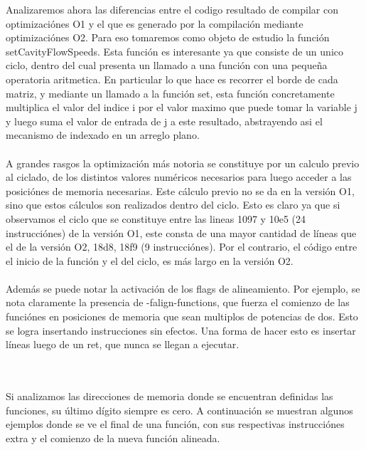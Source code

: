 Analizaremos ahora las diferencias entre el codigo resultado de compilar con optimizaciónes O1 y el que es generado por la compilación mediante optimizaciónes O2. Para eso tomaremos como objeto de estudio la función setCavityFlowSpeeds. Esta función es interesante ya que consiste de un unico ciclo, dentro del cual presenta un llamado a una función con una pequeña operatoria aritmetica. En particular lo que hace es recorrer el borde de cada matriz, y mediante un llamado a la función set, esta función concretamente multiplica el valor del indice i por el valor maximo que puede tomar la variable j y luego suma el valor de entrada de j a este resultado, abstrayendo asi el mecanismo de indexado en un arreglo plano.  
~\\
~\\
A grandes rasgos la optimización más notoria se constituye por un calculo previo al ciclado, de los distintos valores numéricos necesarios para luego acceder a las posiciónes de memoria necesarias. Este cálculo previo no se da en la versión O1, sino que estos cálculos son realizados dentro del ciclo. Esto es claro ya que si observamos el ciclo que se constituye entre las lineas 1097 y 10e5 (24 instrucciónes) de la versión O1, este consta de una mayor cantidad de líneas que el de la versión O2, 18d8, 18f9 (9 instrucciónes). Por el contrario, el código entre el inicio de la función y el del ciclo, es más largo en la versión O2. 
~\\
~\\


Además se puede notar la activación de los flags de alineamiento. Por ejemplo, se nota claramente la presencia de -falign-functions, que fuerza el comienzo de las funciónes en posiciones de memoria que sean multiplos de potencias de dos. Esto se logra insertando instrucciones sin efectos. Una forma de hacer esto es insertar líneas luego de un ret, que nunca se llegan a ejecutar. 

~\\
~\\

Si analizamos las direcciones de memoria donde se encuentran definidas las funciones, su último dígito siempre es cero. A continuación se muestran algunos ejemplos donde se ve el final de una función, con sus respectivas instrucciónes extra y el comienzo de la nueva función alineada.

